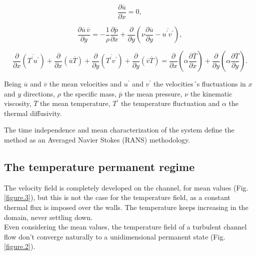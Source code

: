 \documentclass[10pt]{article} %
\begin{document}
\begin{equation}\label{mass}
\frac{\partial \overline{u}}{\partial x} = 0,
\end{equation}

\begin{equation}\label{dynamics}
\frac{\partial \overline{u} \, \overline{v}}{\partial y} = 
- \frac{1}{\rho} \frac{\partial \overline{p}}{\partial x} + \frac{\partial}{\partial y}\left(\nu \frac{\partial \overline{u}}{\partial y} - \overline{u^\prime v^\prime}\right),
\end{equation}


\begin{equation}\label{energy permanent}
\frac{\partial{}}{\partial{x}} \left(\overline{T^\prime u^\prime}\right) + \frac{\partial{}}{\partial{x}}\left(\overline{u} \overline{T}\right)     + 
\frac{\partial{}}{\partial{y}} \left(\overline{T^\prime v^\prime}\right) + \frac{\partial{}}{\partial{y}}\left(\overline{v} \overline{T}\right) 
=
{\frac{\partial{}}{\partial{x}}} \left(\alpha {\frac{\partial{\overline{T}}}{\partial{x}}} \right) +
{\frac{\partial{}}{\partial{y}}} \left(\alpha {\frac{\partial{\overline{T}}}{\partial{y}}} \right). 
\end{equation}

Being $\overline{u}$ and $\overline{v}$ the mean velocities and $u^\prime$ and $v^\prime$ the velocities´s fluctuations in $x$ and $y$ directions, $\rho$ the specific mass, $\overline{p}$ the mean pressure, $\nu$ the kinematic viscosity, $\overline{T}$ the mean temperature, $T^\prime$ the temperature fluctuation and $\alpha$ the thermal diffusivity.  

The time independence and mean characterization of the system define the method as an Averaged Navier Stokes (RANS) methodology.

\subsection{The temperature permanent regime}

The velocity field is completely developed on the channel, for mean values (Fig. \ref{figure.3}), but this is not the case for the temperature field, as a constant thermal flux is imposed over the walls. The temperature keeps increasing in the domain, never settling down.\\
Even considering the mean values, the temperature field of a turbulent channel flow don't converge naturally to a unidimensional permanent state (Fig. \ref{figure.2}).
\end{document}
